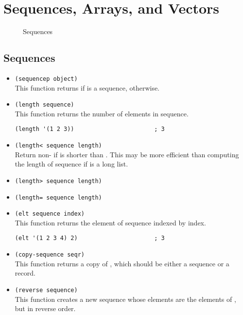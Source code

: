 
\chapter{Sequences, Arrays, and Vectors}
\label{cha:sequ-arrays-vect}

\begin{figure}[H]
  \centering
  \caption{Sequences}
  \label{fig:sequences}
\end{figure}


\section{Sequences}
\label{sec:sequences}


\begin{itemize}
\item \lstinline|(sequencep object)|\\
  This function returns  if  is a sequence,  otherwise.
\item \lstinline|(length sequence)|\\
  This function returns the number of elements in sequence.
\begin{lstlisting}
(length '(1 2 3))                       ; 3
\end{lstlisting}
\item \lstinline|(length< sequence length)|\\
  Return non- if  is shorter than .
  This may be more efficient than computing the length of sequence if  is a long list.
\item \lstinline|(length> sequence length)|
\item \lstinline|(length= sequence length)|
\item \lstinline|(elt sequence index)|\\
  This function returns the element of sequence indexed by index.
\begin{lstlisting}
(elt '(1 2 3 4) 2)                      ; 3
\end{lstlisting}
\item \lstinline|(copy-sequence seqr)|\\
  This function returns a copy of , which should be either a sequence or a record.
\item \lstinline|(reverse sequence)|\\
  This function creates a new sequence whose elements are the elements of , but in reverse order.

\end{itemize}
